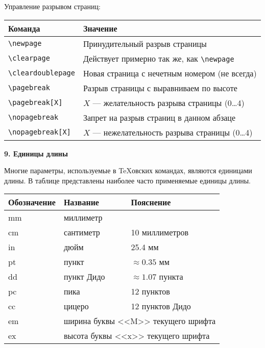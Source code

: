 \documentclass{article}
\begin{document}
Управление разрывом страниц:

\begin{center}
\begin{tabular}{|l|l|}
\hline
\bfseries Команда      &\bfseries Значение                                  \\ \hline
\verb"\newpage"        & Принудительный разрыв страницы                     \\
\verb"\clearpage"      & Действует примерно так же, как \verb"\newpage"     \\
\verb"\cleardoublepage"& Новая страница с нечетным номером (не всегда)      \\
\verb"\pagebreak"      & Разрыв страницы с выравниваем по высоте            \\
\verb"\pagebreak[X]"   & $X$ --- желательность разрыва страницы (0\ldots4)  \\
\verb"\nopagebreak"    & Запрет на разрыв страниц в данном абзаце           \\
\verb"\nopagebreak[X]" & $X$ --- нежелательность разрыва страницы (0\ldots4)\\ \hline
\end{tabular}
\end{center}


\newpage

\textbf{9. Единицы длины}

Многие параметры, используемые в \TeX овских командах, являются единицами длины. В таблице представлены наиболее часто применяемые единицы длины.

\begin{center}
\begin{tabular}{|l|l|l|}
\hline
\textbf{Обозначение} & \textbf{Название} & \textbf{Пояснение}    \\ \hline
mm                   & миллиметр         &                       \\
cm                   & сантиметр         & 10 миллиметров        \\
in                   & дюйм              & 25.4 мм               \\
pt                   & пункт             & $\approx 0.35$ мм     \\
dd                   & пункт Дидо        & $\approx 1.07$ пункта \\
pc                   & пика              & 12 пунктов            \\
cc                   & цицеро            & 12 пунктов Дидо       \\ \hline
em                   & \multicolumn{2}{|l|}{ширина буквы <<M>> текущего шрифта}    \\
ex                   & \multicolumn{2}{|l|}{высота буквы <<x>> текущего шрифта}    \\ \hline
\end{tabular}
\end{center}
\end{document}

